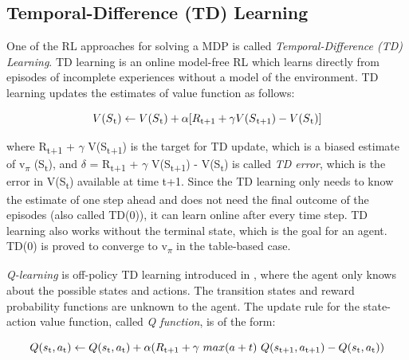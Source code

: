 \documentclass[11pt,twoside]{report}
\theoremstyle{plain}
\theoremstyle{definition}
\begin{document}
\subsection{Temporal-Difference (TD) Learning}
\label{td_learning_section}

One of the RL approaches for solving a MDP is called \textit{Temporal-Difference (TD) Learning}.
TD learning is an online model-free RL which learns directly from episodes of incomplete experiences without a model of the environment.
TD learning updates the estimates of value function as follows:

\begin{equation}
\centering
V(S\textsubscript{t}) \leftarrow V(S\textsubscript{t}) + \alpha[R\textsubscript{t+1} + \gamma V(S\textsubscript{t+1}) - V(S\textsubscript{t})]
\end{equation}

where R\textsubscript{t+1} + $\gamma$ V(S\textsubscript{t+1}) is the target for TD update, which is a biased estimate of v\textsubscript{$\pi$} (S\textsubscript{t}), and $\delta$ = R\textsubscript{t+1} + $\gamma$ V(S\textsubscript{t+1}) - V(S\textsubscript{t}) is called \textit{TD error}, which is the error in V(S\textsubscript{t}) available at time t+1.
Since the TD learning only needs to know the estimate of one step ahead and does not need the final outcome of the episodes (also called TD(0)), it can learn online after every time step. TD learning also works without the terminal state, which is the goal for an agent.
TD(0) is proved to converge to v\textsubscript{$\pi$} in the table-based case.


\textit{Q-learning} is off-policy TD learning introduced in \cite{Watkins}, where the agent only knows about the possible states and actions.  
The transition states and reward probability functions are unknown to the agent.
The update rule for the state-action value function, called \textit{Q function}, is of the form:

\begin{equation}\label{eq:q_learning}
Q(s\textsubscript{t},a\textsubscript{t}) \leftarrow Q(s\textsubscript{t},a\textsubscript{t}) +  \alpha(R\textsubscript{t+1} + \gamma \ max (a+t) \ Q(s\textsubscript{t+1}, a\textsubscript{t+1}) - Q(s\textsubscript{t}, a\textsubscript{t}))
\end{equation}
\end{document}
